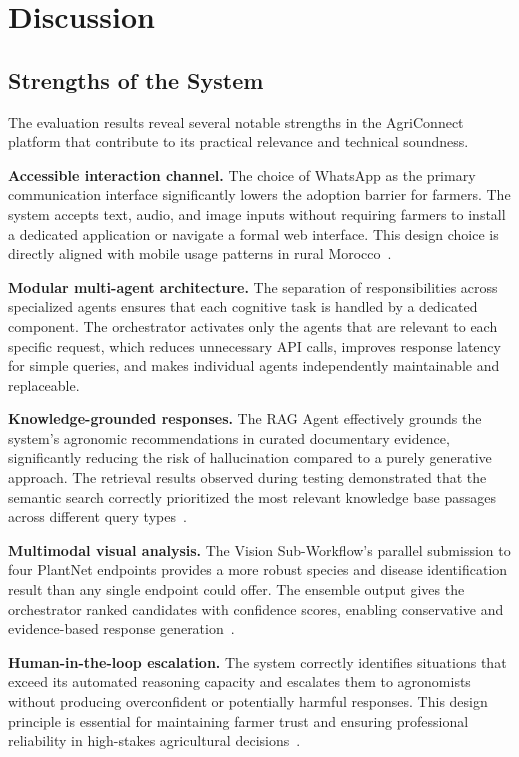 \section{Discussion}

\subsection{Strengths of the System}

The evaluation results reveal several notable strengths in the AgriConnect platform that contribute to its practical relevance and technical soundness.

\textbf{Accessible interaction channel.} The choice of WhatsApp as the primary communication interface significantly lowers the adoption barrier for farmers. The system accepts text, audio, and image inputs without requiring farmers to install a dedicated application or navigate a formal web interface. This design choice is directly aligned with mobile usage patterns in rural Morocco~\cite{anrt2025}.

\textbf{Modular multi-agent architecture.} The separation of responsibilities across specialized agents ensures that each cognitive task is handled by a dedicated component. The orchestrator activates only the agents that are relevant to each specific request, which reduces unnecessary API calls, improves response latency for simple queries, and makes individual agents independently maintainable and replaceable.

\textbf{Knowledge-grounded responses.} The RAG Agent effectively grounds the system's agronomic recommendations in curated documentary evidence, significantly reducing the risk of hallucination compared to a purely generative approach. The retrieval results observed during testing demonstrated that the semantic search correctly prioritized the most relevant knowledge base passages across different query types~\cite{li2025llm}.

\textbf{Multimodal visual analysis.} The Vision Sub-Workflow's parallel submission to four PlantNet endpoints provides a more robust species and disease identification result than any single endpoint could offer. The ensemble output gives the orchestrator ranked candidates with confidence scores, enabling conservative and evidence-based response generation~\cite{zhu2025vlm}.

\textbf{Human-in-the-loop escalation.} The system correctly identifies situations that exceed its automated reasoning capacity and escalates them to agronomists without producing overconfident or potentially harmful responses. This design principle is essential for maintaining farmer trust and ensuring professional reliability in high-stakes agricultural decisions~\cite{yin2025foundation}.

